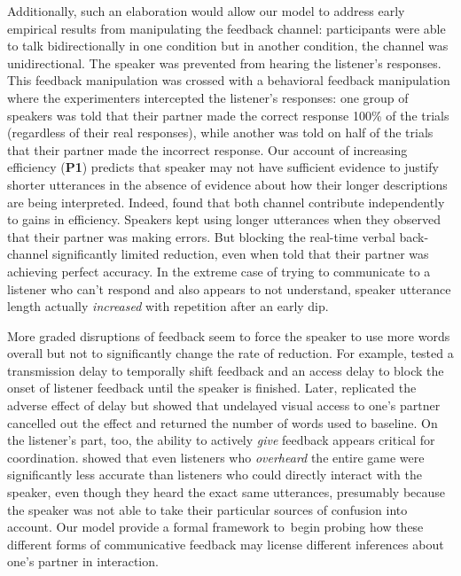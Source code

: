 Additionally, such an elaboration would allow our model to address early empirical results from  manipulating the feedback channel: participants were able to talk bidirectionally in one condition but in another condition, the channel was unidirectional. 
The speaker was prevented from hearing the listener's responses. 
This feedback manipulation was crossed with a behavioral feedback manipulation where the experimenters intercepted the listener's responses: one group of speakers was told that their partner made the correct response 100\% of the trials (regardless of their real responses), while another was told on half of the trials that their partner made the incorrect response. 
Our account of increasing efficiency (\textbf{P1}) predicts that speaker may not have sufficient evidence to justify shorter utterances in the absence of evidence about how their longer descriptions are being interpreted.
Indeed,  found that both channel contribute independently to gains in efficiency.
Speakers kept using longer utterances when they observed that their partner was making errors. 
But blocking the real-time verbal back-channel significantly limited reduction, even when told that their partner was achieving perfect accuracy.
In the extreme case of trying to communicate to a listener who can't respond and also appears to not understand, speaker utterance length actually \emph{increased} with repetition after an early dip. 

More graded disruptions of feedback seem to force the speaker to use more words overall but not to significantly change the rate of reduction. 
For example,  tested a transmission delay to temporally shift feedback and an access delay to block the onset of listener feedback until the speaker is finished. 
Later,  replicated the adverse effect of delay but showed that undelayed visual access to one's partner cancelled out the effect and returned the number of words used to baseline. 
On the listener's part, too, the ability to actively \emph{give} feedback appears critical for coordination. 
 showed that even listeners who \emph{overheard} the entire game were significantly less accurate than listeners who could directly interact with the speaker, even though they heard the exact same utterances, presumably because the speaker was not able to take their particular sources of confusion into account.
Our model provide a formal framework to begin probing how these different forms of communicative feedback may license different inferences about one's partner in interaction.

